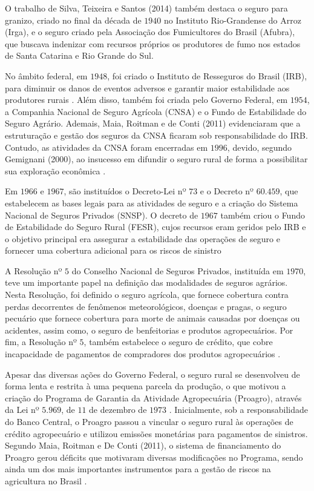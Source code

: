 \documentclass[12pt,a4paper]{article}
\begin{document}
O trabalho de Silva, Teixeira e Santos (2014) também destaca o seguro para granizo, criado no final da década de $1940$ no Instituto Rio-Grandense do Arroz (Irga), e o seguro criado pela Associação dos Fumicultores do Brasil (Afubra), que buscava indenizar com recursos próprios os produtores de fumo nos estados de Santa Catarina e Rio Grande do Sul.

No âmbito federal, em $1948$, foi criado o Instituto de  Resseguros do Brasil (IRB), para diminuir os danos de eventos adversos e garantir maior estabilidade aos produtores rurais \cite{silva14_2}. Além disso, também foi criada pelo Governo Federal, em $1954$, a Companhia Nacional de Seguro Agrícola (CNSA) e o Fundo de Estabilidade do Seguro Agrário. Ademais, Maia,  Roitman e de Conti (2011) evidenciaram que a estruturação e gestão dos seguros da CNSA ficaram sob responsabilidade do IRB. Contudo, as atividades da CNSA foram encerradas em $1996$, devido, segundo Gemignani (2000), ao insucesso em difundir o seguro rural de forma a possibilitar sua exploração econômica \cite{maia11, silva14_2}.

Em $1966$ e $1967$, são instituídos o Decreto-Lei nº $73$ e o Decreto nº $60.459$, que estabelecem as bases legais para as atividades de seguro e a criação do Sistema Nacional de Seguros Privados (SNSP). O decreto de $1967$ também criou o Fundo de Estabilidade do Seguro Rural (FESR), cujos recursos eram geridos pelo IRB e o objetivo principal era assegurar a estabilidade das operações de seguro e fornecer uma cobertura adicional para os riscos de sinistro \cite{silva14_2}

A Resolução nº $5$ do Conselho Nacional de Seguros Privados, instituída em $1970$, teve um importante papel na definição das modalidades de seguros agrários. Nesta Resolução, foi definido o seguro agrícola, que fornece cobertura contra perdas decorrentes de fenômenos meteorológicos, doenças e pragas, o seguro pecuário que fornece cobertura para morte de animais causadas por doenças ou acidentes, assim como, o seguro de benfeitorias e produtos agropecuários. Por fim, a Resolução nº $5$, também estabelece o seguro de crédito, que cobre incapacidade de pagamentos de compradores dos produtos agropecuários \cite{silva14_2}.

Apesar das diversas ações do Governo Federal, o seguro rural se desenvolveu de forma lenta e restrita à uma pequena parcela da produção, o que motivou a criação do Programa de Garantia da Atividade Agropecuária (Proagro), através da Lei nº $5.969$, de $11$ de dezembro de $1973$ \cite{silva14_2}. Inicialmente, sob a responsabilidade do Banco Central, o Proagro passou a vincular o seguro rural às operações de crédito agropecuário e utilizou emissões monetárias para pagamentos de sinistros. Segundo Maia, Roitman e De Conti (2011), o sistema de financiamento do Proagro gerou déficits que motivaram diversas modificações no Programa, sendo ainda um dos mais importantes instrumentos para a gestão de riscos na agricultura no Brasil \cite{maia11}.
\end{document}
